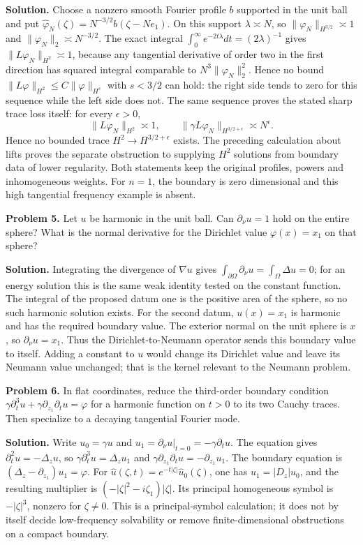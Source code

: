 \documentclass[
  11pt,
]{article}
\begin{document}
\textbf{Solution.} Choose a nonzero smooth Fourier profile \(b\)
supported in the unit ball and put
\(\widehat\varphi_N(\zeta)=N^{-3/2}b(\zeta-Ne_1)\). On this support
\(\lambda\asymp N\), so \(\|\varphi_N\|_{H^{3/2}}\asymp1\) and
\(\|\varphi_N\|_2\asymp N^{-3/2}\). The exact integral
\(\int_0^\infty e^{-2t\lambda}dt=(2\lambda)^{-1}\) gives
\(\|L\varphi_N\|_{H^2}\asymp1\), because any tangential derivative of
order two in the first direction has squared integral comparable to
\(N^3\|\varphi_N\|_2^2\). Hence no bound
\(\|L\varphi\|_{H^2}\leq C\|\varphi\|_{H^s}\) with \(s<3/2\) can hold:
the right side tends to zero for this sequence while the left side does
not. The same sequence proves the stated sharp trace loss itself: for
every \(\epsilon>0\), \[
 \|L\varphi_N\|_{H^2}\asymp1,\qquad
 \|\gamma L\varphi_N\|_{H^{3/2+\epsilon}}\asymp N^\epsilon.
 \tag{BR6}
\] Hence no bounded trace \(H^2\to H^{3/2+\epsilon}\) exists. The
preceding calculation about lifts proves the separate obstruction to
supplying \(H^2\) solutions from boundary data of lower regularity. Both
statements keep the original profiles, powers and inhomogeneous weights.
For \(n=1\), the boundary is zero dimensional and this high tangential
frequency example is absent.

\textbf{Problem 5.} Let \(u\) be harmonic in the unit ball. Can
\(\partial_\nu u=1\) hold on the entire sphere? What is the normal
derivative for the Dirichlet value \(\varphi(x)=x_1\) on that sphere?

\textbf{Solution.} Integrating the divergence of \(\nabla u\) gives
\(\int_{\partial\Omega}\partial_\nu u=\int_\Omega\Delta u=0\); for an
energy solution this is the same weak identity tested on the constant
function. The integral of the proposed datum one is the positive area of
the sphere, so no such harmonic solution exists. For the second datum,
\(u(x)=x_1\) is harmonic and has the required boundary value. The
exterior normal on the unit sphere is \(x\), so \(\partial_\nu u=x_1\).
Thus the Dirichlet-to-Neumann operator sends this boundary value to
itself. Adding a constant to \(u\) would change its Dirichlet value and
leave its Neumann value unchanged; that is the kernel relevant to the
Neumann problem.

\textbf{Problem 6.} In flat coordinates, reduce the third-order boundary
condition
\(\gamma\partial_t^3u+\gamma\partial_{z_1}\partial_tu=\varphi\) for a
harmonic function on \(t>0\) to its two Cauchy traces. Then specialize
to a decaying tangential Fourier mode.

\textbf{Solution.} Write \(u_0=\gamma u\) and
\(u_1=\partial_\nu u|_{t=0}=-\gamma\partial_tu\). The equation gives
\(\partial_t^2u=-\Delta_z u\), so \(\gamma\partial_t^3u=\Delta_z u_1\)
and \(\gamma\partial_{z_1}\partial_tu=-\partial_{z_1}u_1\). The boundary
equation is \((\Delta_z-\partial_{z_1})u_1=\varphi\). For
\(\widehat u(\zeta,t)=e^{-t|\zeta|}\widehat u_0(\zeta)\), one has
\(u_1=|D_z|u_0\), and the resulting multiplier is
\((-|\zeta|^2-i\zeta_1)|\zeta|\). Its principal homogeneous symbol is
\(-|\zeta|^3\), nonzero for \(\zeta\ne0\). This is a principal-symbol
calculation; it does not by itself decide low-frequency solvability or
remove finite-dimensional obstructions on a compact boundary.
\end{document}
